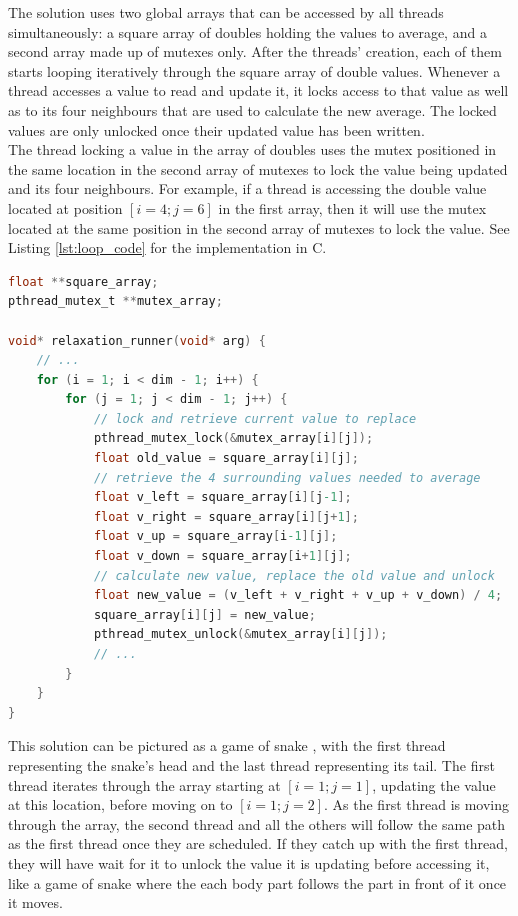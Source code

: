 \documentclass[letterpaper,12pt]{article}
\begin{document}
The solution uses two global arrays that can be accessed by all threads simultaneously: a square array of doubles holding the values to average, and a second array made up of mutexes only. After the threads' creation, each of them starts looping iteratively through the square array of double values. Whenever a thread accesses a value to read and update it, it locks access to that value as well as to its four neighbours that are used to calculate the new average. The locked values are only unlocked once their updated value has been written.\\

The thread locking a value in the array of doubles uses the mutex positioned in the same location in the second array of mutexes to lock the value being updated and its four neighbours. For example, if a thread is accessing the double value located at position $[i=4; j=6]$ in the first array, then it will use the mutex located at the same position in the second array of mutexes to lock the value. See Listing \ref{lst:loop_code} for the implementation in C.\\

\begin{lstlisting}[language=C, caption=Looping through the arrays (main.c), label={lst:loop_code}]
float **square_array;
pthread_mutex_t **mutex_array;

void* relaxation_runner(void* arg) {
    // ...
    for (i = 1; i < dim - 1; i++) {
    	for (j = 1; j < dim - 1; j++) {
    		// lock and retrieve current value to replace
    		pthread_mutex_lock(&mutex_array[i][j]);
    		float old_value = square_array[i][j];
    		// retrieve the 4 surrounding values needed to average
    		float v_left = square_array[i][j-1];
    		float v_right = square_array[i][j+1];
    		float v_up = square_array[i-1][j];
    		float v_down = square_array[i+1][j];
    		// calculate new value, replace the old value and unlock
    		float new_value = (v_left + v_right + v_up + v_down) / 4;
    		square_array[i][j] = new_value;
    		pthread_mutex_unlock(&mutex_array[i][j]);
    		// ...
    	}
    }
}
\end{lstlisting}

This solution can be pictured as a game of snake \cite{snake_game}, with the first thread representing the snake's head and the last thread representing its tail. The first thread iterates through the array starting at $[i=1; j=1]$, updating the value at this location, before moving on to $[i=1; j=2]$. As the first thread is moving through the array, the second thread and all the others will follow the same path as the first thread once they are scheduled. If they catch up with the first thread, they will have wait for it to unlock the value it is updating before accessing it, like a game of snake where the each body part follows the part in front of it once it moves.\\
\end{document}
